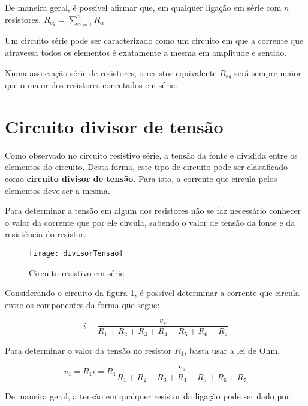 \documentclass[12pt,fleqn]{book} %
\begin{document}
De maneira geral, é possível afirmar que, em qualquer ligação em série com $n$ resistores, $R_{eq} = \sum\limits_{\alpha = 1}^{n}R_\alpha$

\begin{remark}
 Um circuito série pode ser caracterizado como um circuito em que a corrente que atravessa todos os elementos é exatamente a mesma em amplitude e sentido.
\end{remark}

\begin{remark}
Numa associação série de resistores, o resistor equivalente $R_{eq}$ será sempre maior que o maior dos resistores conectados em série.
\end{remark}

\section{Circuito divisor de tensão}

Como observado no circuito resistivo série, a tensão da fonte é dividida entre os elementos do circuito. Desta forma, este tipo de circuito pode ser classificado como \textbf{circuito divisor de tensão}. Para isto, a corrente que circula pelos elementos deve ser a mesma.

Para determinar a tensão em algum dos resistores não se faz necessário conhecer o valor da corrente que por ele circula, sabendo o valor de tensão da fonte e da resistência do resistor.

        \begin{figure}[!htbp] \centering\texttt{[image: divisorTensao]}
            \caption{Circuito resistivo em série}\label{divisorTensao} 
        \end{figure}
        
Considerando o circuito da figura \ref{divisorTensao}, é possível determinar a corrente que circula entre os componentes da forma que segue:

\begin{equation}
i = \frac{v_s}{R_1+R_2+R_3+R_4+R_5+R_6+R_7}
\end{equation}

Para determinar o valor da tensão no resistor $R_1$, basta usar a lei de Ohm.

\begin{equation}
v_1 = R_1i = R_1\frac{v_s}{R_1+R_2+R_3+R_4+R_5+R_6+R_7}
\end{equation}

De maneira geral, a tensão em qualquer resistor da ligação pode ser dado por:
\end{document}
